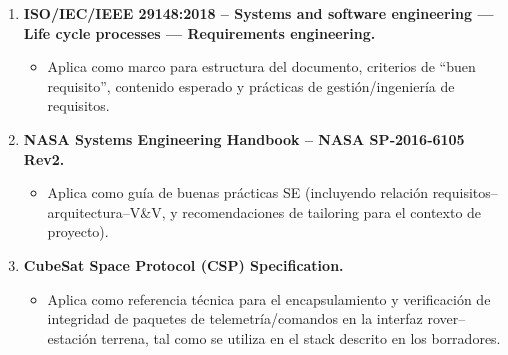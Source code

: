 \begin{enumerate}
    \item \textbf{ISO/IEC/IEEE 29148:2018 – Systems and software engineering — Life cycle processes — Requirements engineering.} \cite{ieee_29148}
    \begin{itemize}
        \item Aplica como marco para estructura del documento, criterios de ``buen requisito'', contenido esperado y prácticas de gestión/ingeniería de requisitos.
    \end{itemize}

    \item \textbf{NASA Systems Engineering Handbook – NASA SP‑2016‑6105 Rev2.} \cite{nasa_se_handbook}
    \begin{itemize}
        \item Aplica como guía de buenas prácticas SE (incluyendo relación requisitos\allowbreak –\allowbreak arquitectura\allowbreak –\allowbreak V\&V, y recomendaciones de tailoring para el contexto de proyecto).
    \end{itemize}

    \item \textbf{CubeSat Space Protocol (CSP) Specification.} \cite{csp_spec}
    \begin{itemize}
        \item Aplica como referencia técnica para el encapsulamiento y verificación de integridad de paquetes de telemetría/comandos en la interfaz rover–estación terrena, tal como se utiliza en el stack descrito en los borradores. \cite{ieee_29148, nasa_se_handbook, segoldmine_ppi}
    \end{itemize}
\end{enumerate}

